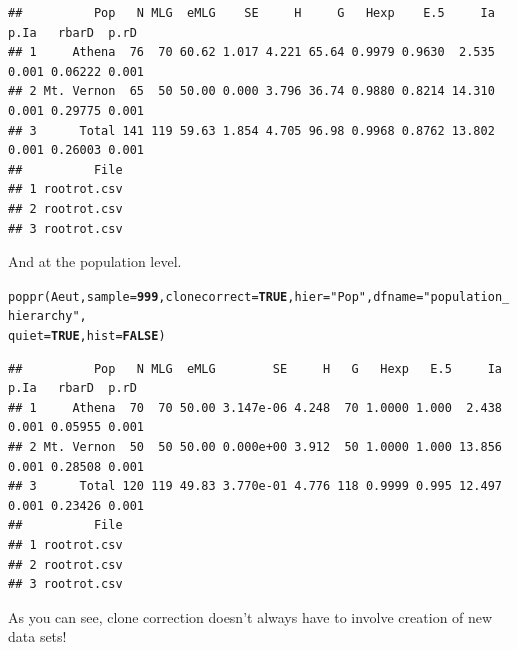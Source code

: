 \documentclass[letterpaper]{article}\usepackage[]{graphicx}\usepackage[]{color}
\makeatletter
\newcommand{\hlnum}[1]{\textcolor[rgb]{0.502,0,0.502}{\textbf{#1}}}%
\newcommand{\hlstr}[1]{\textcolor[rgb]{0.651,0.522,0}{#1}}%
\newcommand{\hlstd}[1]{\textcolor[rgb]{0,0,0}{#1}}%
\newcommand{\hlkwc}[1]{\textcolor[rgb]{0,0.502,0.753}{#1}}%
\newcommand{\hlkwd}[1]{\textcolor[rgb]{0,0.267,0.4}{#1}}%
\newenvironment{kframe}{%
 \def\at@end@of@kframe{}%
 \ifinner\ifhmode%
  \def\at@end@of@kframe{\end{minipage}}%
  \begin{minipage}{\columnwidth}%
 \fi\fi%
 \def\FrameCommand##1{\hskip\@totalleftmargin \hskip-\fboxsep
 \colorbox{shadecolor}{##1}\hskip-\fboxsep
     \hskip-\linewidth \hskip-\@totalleftmargin \hskip\columnwidth}%
 \MakeFramed {\advance\hsize-\width
   \@totalleftmargin\z@ \linewidth\hsize
   \@setminipage}}%
 {\par\unskip\endMakeFramed%
 \at@end@of@kframe}
\newenvironment{knitrout}{}{} %
\makeatother
\begin{document}
\begin{knitrout}\footnotesize
{}\color{fgcolor}\begin{kframe}
\begin{verbatim}
##          Pop   N MLG  eMLG    SE     H     G   Hexp    E.5     Ia  p.Ia   rbarD  p.rD
## 1     Athena  76  70 60.62 1.017 4.221 65.64 0.9979 0.9630  2.535 0.001 0.06222 0.001
## 2 Mt. Vernon  65  50 50.00 0.000 3.796 36.74 0.9880 0.8214 14.310 0.001 0.29775 0.001
## 3      Total 141 119 59.63 1.854 4.705 96.98 0.9968 0.8762 13.802 0.001 0.26003 0.001
##          File
## 1 rootrot.csv
## 2 rootrot.csv
## 3 rootrot.csv
\end{verbatim}
\end{kframe}
\end{knitrout}

And at the population level.
\begin{knitrout}\footnotesize
{}\color{fgcolor}\begin{kframe}
\begin{alltt}
\hlkwd{poppr}\hlstd{(Aeut,} \hlkwc{sample} \hlstd{=} \hlnum{999}\hlstd{,} \hlkwc{clonecorrect} \hlstd{=} \hlnum{TRUE}\hlstd{,} \hlkwc{hier} \hlstd{=} \hlstr{"Pop"}\hlstd{,} \hlkwc{dfname} \hlstd{=} \hlstr{"population_hierarchy"}\hlstd{,}
    \hlkwc{quiet} \hlstd{=} \hlnum{TRUE}\hlstd{,} \hlkwc{hist} \hlstd{=} \hlnum{FALSE}\hlstd{)}
\end{alltt}
\end{kframe}
\end{knitrout}

\begin{knitrout}\footnotesize
{}\color{fgcolor}\begin{kframe}
\begin{verbatim}
##          Pop   N MLG  eMLG        SE     H   G   Hexp   E.5     Ia  p.Ia   rbarD  p.rD
## 1     Athena  70  70 50.00 3.147e-06 4.248  70 1.0000 1.000  2.438 0.001 0.05955 0.001
## 2 Mt. Vernon  50  50 50.00 0.000e+00 3.912  50 1.0000 1.000 13.856 0.001 0.28508 0.001
## 3      Total 120 119 49.83 3.770e-01 4.776 118 0.9999 0.995 12.497 0.001 0.23426 0.001
##          File
## 1 rootrot.csv
## 2 rootrot.csv
## 3 rootrot.csv
\end{verbatim}
\end{kframe}
\end{knitrout}

As you can see, clone correction doesn't always have to involve creation of new data sets!
\end{document}
